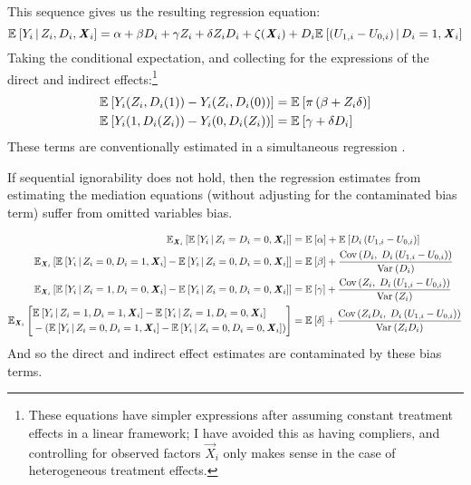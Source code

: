This sequence gives us the resulting regression equation:
\[ \Egiven{Y_i}{Z_i, D_i, \vec X_i} =
    \alpha
    + \beta D_i
    + \gamma Z_i
    + \delta Z_i D_i
    + \zeta(\vec X_i)
    + D_i \Egiven{\left( U_{1,i} - U_{0,i} \right)}{D_i = 1, \vec X_i} \]
Taking the conditional expectation, and collecting for the expressions of the direct and indirect effects:\footnote{
    These equations have simpler expressions after assuming constant treatment effects in a linear framework;
    I have avoided this as having compliers, and controlling for observed factors $\vec X_i$ only makes sense in the case of heterogeneous treatment effects.
}
\begin{align*}
    \E{Y_i(Z_i, D_i(1)) - Y_i(Z_i, D_i(0))}
        &= \E{\pi \left( \beta +  Z_i \delta \right)} \\
    \E{Y_i(1, D_i(Z_i)) - Y_i(0, D_i(Z_i))}
        &= \E{\gamma + \delta D_i}
\end{align*}
These terms are conventionally estimated in a simultaneous regression \citep{imai2010identification}.

If sequential ignorability does not hold, then the regression estimates from estimating the mediation equations (without adjusting for the contaminated bias term) suffer from omitted variables bias.

\begin{align*}
    \E[\vec X_i]{\Egiven{Y_i}{Z_i = D_i = 0, \vec X_i}}
        &= \E\alpha + \E{D_i \left( U_{1,i} - U_{0,i} \right)} \\
    \E[\vec X_i]{\Egiven{Y_i}{Z_i = 0, D_i = 1, \vec X_i}
        - \Egiven{Y_i}{Z_i = 0, D_i = 0, \vec X_i}}
        &= \E\beta + \frac{
        \Cov{D_i,\; D_i \left( U_{1,i} - U_{0,i} \right)}}{\Var{D_i}} \\
    \E[\vec X_i]{\Egiven{Y_i}{Z_i = 1, D_i = 0, \vec X_i}
        - \Egiven{Y_i}{Z_i = 0, D_i = 0, \vec X_i}}
        &= \E\gamma + \frac{
        \Cov{Z_i,\; D_i \left( U_{1,i} - U_{0,i} \right)}}{\Var{Z_i}} \\
    \E[\vec X_i]{\begin{aligned}
        &\Egiven{Y_i}{Z_i = 1, D_i = 1, \vec X_i}
            - \Egiven{Y_i}{Z_i = 1, D_i = 0, \vec X_i} \\
            &- \left( \Egiven{Y_i}{Z_i = 0, D_i = 1, \vec X_i}
                - \Egiven{Y_i}{Z_i = 0, D_i = 0, \vec X_i} \right)
        \end{aligned}}
    &= \E\delta + \frac{
        \Cov{Z_i D_i,\; D_i \left( U_{1,i} - U_{0,i} \right)}}{\Var{Z_i D_i}}
\end{align*}
And so the direct and indirect effect estimates are contaminated by these bias terms.

